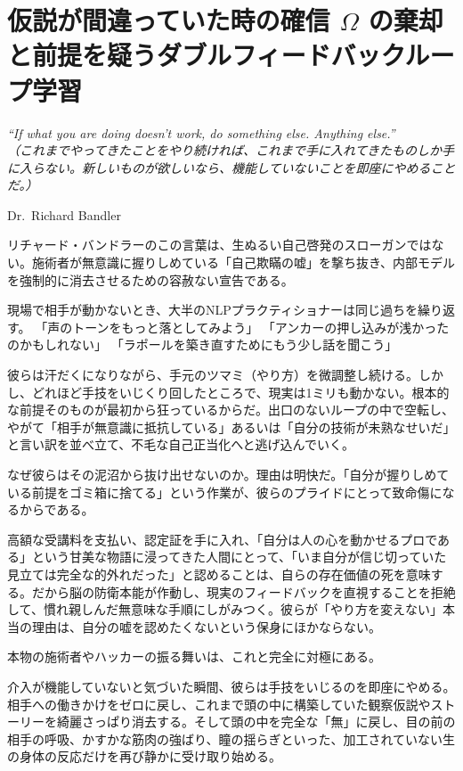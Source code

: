 \chapter{仮説が間違っていた時の確信 $\Omega$ の棄却と前提を疑うダブルフィードバックループ学習}
\epigraph{\textit{``If what you are doing doesn't work, do something else. Anything else.''\\（これまでやってきたことをやり続ければ、これまで手に入れてきたものしか手に入らない。新しいものが欲しいなら、機能していないことを即座にやめることだ。）}}{Dr.~Richard Bandler}

リチャード・バンドラーのこの言葉は、生ぬるい自己啓発のスローガンではない。施術者が無意識に握りしめている「自己欺瞞の嘘」を撃ち抜き、内部モデルを強制的に消去させるための容赦ない宣告である。

現場で相手が動かないとき、大半のNLPプラクティショナーは同じ過ちを繰り返す。
「声のトーンをもっと落としてみよう」
「アンカーの押し込みが浅かったのかもしれない」
「ラポールを築き直すためにもう少し話を聞こう」

彼らは汗だくになりながら、手元のツマミ（やり方）を微調整し続ける。しかし、どれほど手技をいじくり回したところで、現実は1ミリも動かない。根本的な前提そのものが最初から狂っているからだ。出口のないループの中で空転し、やがて「相手が無意識に抵抗している」あるいは「自分の技術が未熟なせいだ」と言い訳を並べ立て、不毛な自己正当化へと逃げ込んでいく。

なぜ彼らはその泥沼から抜け出せないのか。理由は明快だ。「自分が握りしめている前提をゴミ箱に捨てる」という作業が、彼らのプライドにとって致命傷になるからである。

高額な受講料を支払い、認定証を手に入れ、「自分は人の心を動かせるプロである」という甘美な物語に浸ってきた人間にとって、「いま自分が信じ切っていた見立ては完全な的外れだった」と認めることは、自らの存在価値の死を意味する。だから脳の防衛本能が作動し、現実のフィードバックを直視することを拒絶して、慣れ親しんだ無意味な手順にしがみつく。彼らが「やり方を変えない」本当の理由は、自分の嘘を認めたくないという保身にほかならない。

本物の施術者やハッカーの振る舞いは、これと完全に対極にある。

介入が機能していないと気づいた瞬間、彼らは手技をいじるのを即座にやめる。相手への働きかけをゼロに戻し、これまで頭の中に構築していた観察仮説やストーリーを綺麗さっぱり消去する。そして頭の中を完全な「無」に戻し、目の前の相手の呼吸、かすかな筋肉の強ばり、瞳の揺らぎといった、加工されていない生の身体の反応だけを再び静かに受け取り始める。

